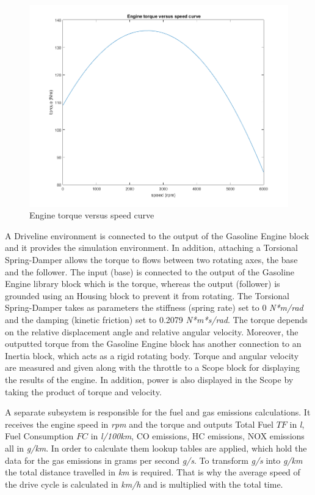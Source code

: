 \begin{figure}[h]
\centering
\includegraphics[scale=0.4]{figures/enginecurve}
\caption{Engine torque versus speed curve}
\label{fig:engineTorqueSpeed}
\end{figure}

A Driveline environment is connected to the output of the Gasoline Engine block and it provides the simulation environment. In addition, attaching a Torsional Spring-Damper \citep{tsdMatlab} allows the torque to flows between two rotating axes, the base and the follower. The input (base) is connected to the output of the Gasoline Engine library block which is the torque, whereas the output (follower) is grounded using an Housing block to prevent it from rotating. The Torsional Spring-Damper takes as parameters the stiffness (spring rate) set to 0 \textit{N*m/rad} and the damping (kinetic friction) set to 0.2079 \textit{N*m*s/rad}. The torque depends on the relative displacement angle and relative angular velocity. Moreover, the outputted torque from the Gasoline Engine block has another connection to an Inertia block, which acts as a rigid rotating body. Torque and angular velocity are measured and given along with the throttle to a Scope block for displaying the results of the engine. In addition, power is also displayed in the Scope by taking the product of torque and velocity.

A separate subsystem is responsible for the fuel and gas emissions calculations. It receives the engine speed in \textit{rpm} and the torque and outputs Total Fuel $TF$ in \textit{l}, Fuel Consumption $FC$ in \textit{l/100km}, CO emissions, HC emissions, NOX emissions all in \textit{g/km}. In order to calculate them lookup tables are applied, which hold the data for the gas emissions in grams per second \textit{g/s}. To transform \textit{g/s} into \textit{g/km} the total distance travelled in \textit{km} is required. That is why the average speed of the drive cycle is calculated in \textit{km/h} and is multiplied with the total time. 

